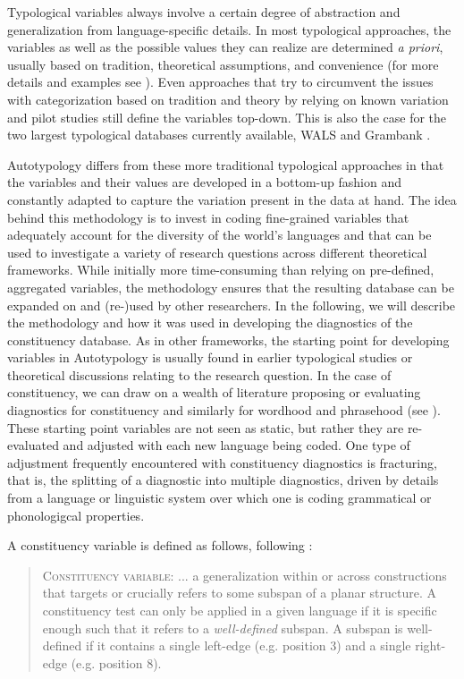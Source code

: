 \documentclass[output=paper,draftmode]{langscibook}
\begin{document}
Typological variables always involve a certain degree of abstraction and generalization from language-specific details. In most typological approaches, the variables as well as the possible values they can realize are determined \textit{a priori}, usually based on tradition, theoretical assumptions, and convenience (for more details and examples see \citealt[632]{witzlack2022managing}).
Even approaches that try to circumvent the issues with categorization based on tradition and theory by relying on known variation and pilot studies still define the variables top-down. This is also the case for the two largest typological databases currently available, WALS \citep{dryer2013wals} and Grambank \citep{skirgard2023grambank}.

Autotypology differs from these more traditional typological approaches in that the variables and their values are developed in a bottom-up fashion and constantly adapted to capture the variation present in the data at hand.
The idea behind this methodology is to invest in coding fine-grained variables that adequately account for the diversity of the world's languages and that can be used to investigate a variety of research questions across different theoretical frameworks. 
While initially more time-consuming than relying on pre-defined, aggregated variables, the methodology ensures that the resulting database can be expanded on and (re-)used by other researchers.
In the following, we will describe the methodology and how it was used in developing the diagnostics of the constituency database.
As in other frameworks, the starting point for developing variables in Autotypology is usually found in earlier typological studies or theoretical discussions relating to the research question. In the case of constituency, we can draw on a wealth of literature proposing or evaluating diagnostics for constituency and similarly for wordhood and phrasehood (see ).
These starting point variables are not seen as static, but rather they are re-evaluated and adjusted with each new language being coded. One type of adjustment frequently encountered with constituency diagnostics is fracturing, that is, the splitting of a diagnostic into multiple diagnostics, driven by details from a language or linguistic system over which one is coding grammatical or phonologigcal properties.

A constituency variable is defined as follows, following  \cite{tallmanconstituency2021}:

\begin{quote}
    \textsc{Constituency variable}:
    ... a generalization within or across constructions that targets or crucially refers to some subspan of a planar structure. A constituency test can only be applied in a given language if it is specific enough such that it refers to a \textit{well-defined} subspan. A subspan is well-defined if it contains a single left-edge (e.g. position 3) and a single right-edge (e.g. position 8).
\end{quote}
\end{document}
